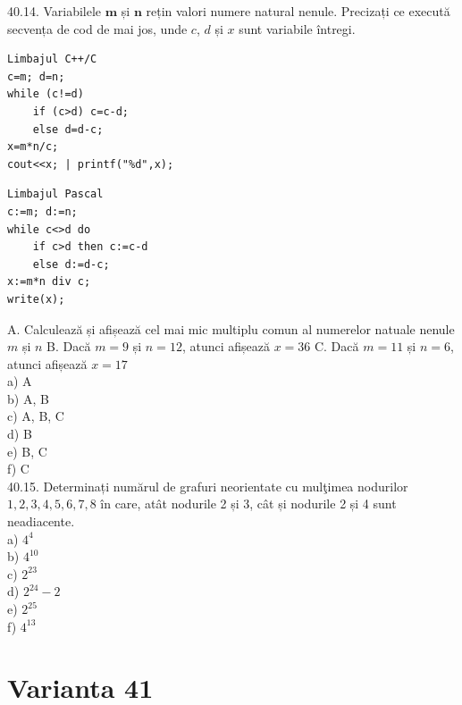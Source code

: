 \begin{itemize}
\begin{enumerate}
40.14. Variabilele $\mathbf{m}$ și $\mathbf{n}$ rețin valori numere natural nenule. Precizați ce execută secvența de cod de mai jos, unde $c$, $d$ și $x$ sunt variabile întregi.
\begin{verbatim}
Limbajul C++/C
c=m; d=n;
while (c!=d)
    if (c>d) c=c-d;
    else d=d-c;
x=m*n/c;
cout<<x; | printf("%d",x);
\end{verbatim}
\begin{verbatim}
Limbajul Pascal
c:=m; d:=n;
while c<>d do
    if c>d then c:=c-d
    else d:=d-c;
x:=m*n div c;
write(x);
\end{verbatim}
A. Calculează și afișează cel mai mic multiplu comun al numerelor natuale nenule $m$ și $n$
B. Dacă $m=9$ și $n=12$, atunci afișează $x=36$
C. Dacă $m=11$ și $n=6$, atunci afișează $x=17$
\\
a) A
\\
b) A, B
\\
c) A, B, C
\\
d) B
\\
e) B, C
\\
f) C
\\
40.15. Determinați numărul de grafuri neorientate cu mulţimea nodurilor ${1,2,3,4,5,6,7,8}$ în care, atât nodurile 2 și 3, cât și nodurile 2 și 4 sunt neadiacente.
\\
a) $4^{4}$
\\
b) $4^{10}$
\\
c) $2^{23}$
\\
d) $2^{24}-2$
\\
e) $2^{25}$
\\
f) $4^{13}$
\\

\section*{Varianta 41}


\end{enumerate}
\end{itemize}
